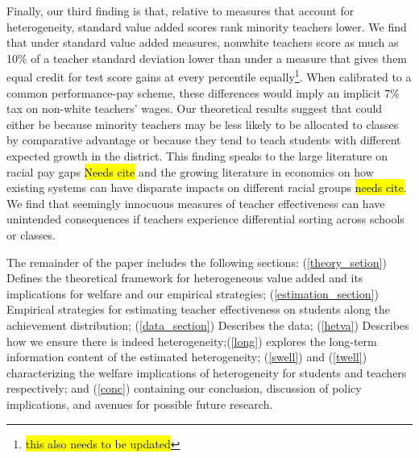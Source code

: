 \documentclass[12pt]{article}
\theoremstyle{definition}
\theoremstyle{definition}
\theoremstyle{definition}
\theoremstyle{definition}
\begin{document}
    Finally, our third finding is that, relative to measures that account for heterogeneity, standard value added scores rank minority teachers lower. We find that under standard value added measures, nonwhite teachers score as much as 10\% of a teacher standard deviation lower than under a measure that gives them equal credit for test score gains at every percentile equally\footnote{\hl{this also needs to be updated}}. When calibrated to a common performance-pay scheme, these differences would imply an implicit 7\% tax on non-white teachers' wages. Our theoretical results suggest that could either be because minority teachers may be less likely to be allocated to classes by comparative advantage or because they tend to teach students with different expected growth in the district. This finding  speaks to the large literature on racial pay gaps \hl{Needs cite} and the growing literature in economics on how existing systems can have disparate impacts on different racial groups \hl{needs cite}. We find that seemingly innocuous measures of teacher effectiveness can have unintended consequences if teachers experience differential sorting across schools or classes.
    
    
    The remainder of the paper includes the following sections: (\ref{theory_setion}) Defines the theoretical framework for heterogeneous value added and its implications for welfare and our empirical strategies; (\ref{estimation_section}) Empirical strategies for estimating teacher effectiveness on students along the achievement distribution; (\ref{data_section}) Describes the data; (\ref{hetva}) Describes how we ensure there is indeed heterogeneity;(\ref{long}) explores the long-term information content of the estimated heterogeneity; (\ref{swell}) and (\ref{twell}) characterizing the welfare implications of heterogeneity for students and teachers respectively; and (\ref{conc}) containing our conclusion, discussion of policy implications, and avenues for possible future research.

\end{document}
